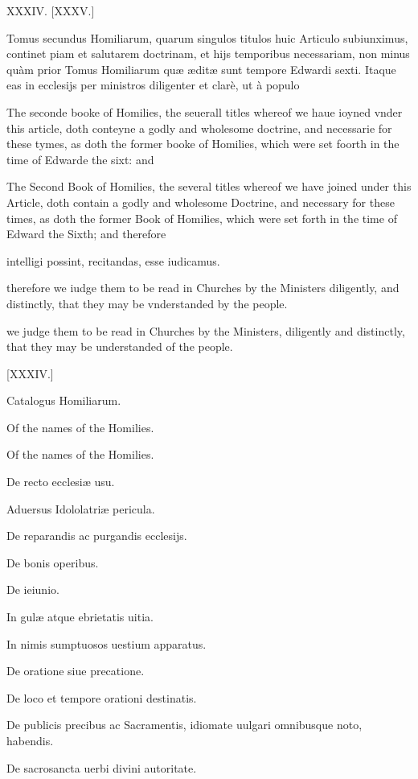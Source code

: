 XXXIV. [XXXV.]


Tomus secundus Homiliarum, quarum singulos titulos huic Articulo subiunximus, continet piam et salutarem doctrinam, et hijs temporibus necessariam, non minus quàm prior Tomus Homiliarum quæ æditæ sunt tempore Edwardi sexti. Itaque eas in ecclesijs per ministros diligenter et clarè, ut à populo

The seconde booke of Homilies, the seuerall titles whereof we haue ioyned vnder this article, doth conteyne a godly and wholesome doctrine, and necessarie for these tymes, as doth the former booke of Homilies, which were set foorth in the time of Edwarde the sixt: and

The Second Book of Homilies, the several titles whereof we have joined under this Article, doth contain a godly and wholesome Doctrine, and necessary for these times, as doth the former Book of Homilies, which were set forth in the time of Edward the Sixth; and therefore

intelligi possint, recitandas, esse iudicamus.

therefore we iudge them to be read in Churches by the Ministers diligently, and distinctly, that they may be vnderstanded by the people.

we judge them to be read in Churches by the Ministers, diligently and distinctly, that they may be understanded of the people.

[XXXIV.]

Catalogus Homiliarum.

Of the names of the Homilies.

Of the names of the Homilies.

De recto ecclesiæ usu.

Aduersus Idololatriæ pericula.

De reparandis ac purgandis ecclesijs.

De bonis operibus.

De ieiunio.

In gulæ atque ebrietatis uitia.

In nimis sumptuosos uestium apparatus.

De oratione siue precatione.

De loco et tempore orationi destinatis.

De publicis precibus ac Sacramentis, idiomate uulgari omnibusque noto, habendis.

De sacrosancta uerbi divini autoritate.

